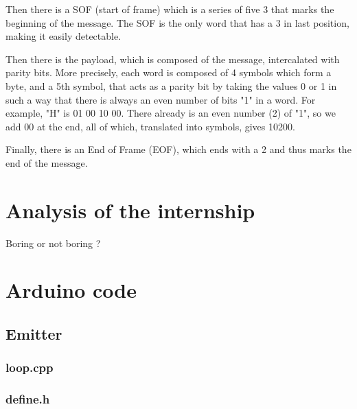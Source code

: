 \documentclass[12pt]{report}
\begin{document}
Then there is a SOF (start of frame) which is a series of five 3 that marks the beginning of the message. The SOF is the only word that has a 3 in last position, making it easily detectable.

Then there is the payload, which is composed of the message, intercalated with parity bits. More precisely, each word is composed of 4 symbols which form a byte, and a 5th symbol, that acts as a parity bit by taking the values 0 or 1 in such a way that there is always an even number of bits "1" in a word.
For example, "H" is 01 00 10 00. There already is an even number (2) of "1", so we add 00 at the end, all of which, translated into symbols, gives 10200.

Finally, there is an End of Frame (EOF), which ends with a 2 and thus marks the end of the message.











\chapter{Analysis of the internship}

Boring or not boring ?












\appendix

\chapter{Arduino code}

\section{Emitter}

\subsection{loop.cpp}



\subsection{define.h}
\end{document}
